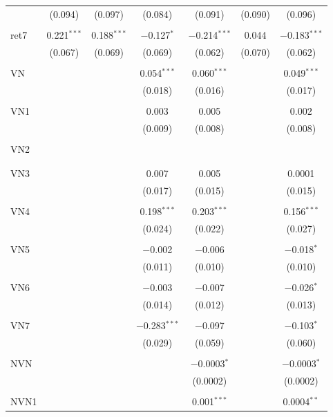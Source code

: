 \begin{table}[!htbp]
\begin{tabular}{@{\extracolsep{5pt}}lcccccc}
  & (0.094) & (0.097) & (0.084) & (0.091) & (0.090) & (0.096) \\ 
  & & & & & & \\ 
 ret7 & 0.221$^{***}$ & 0.188$^{***}$ & $-$0.127$^{*}$ & $-$0.214$^{***}$ & 0.044 & $-$0.183$^{***}$ \\ 
  & (0.067) & (0.069) & (0.069) & (0.062) & (0.070) & (0.062) \\ 
  & & & & & & \\ 
 VN &  &  & 0.054$^{***}$ & 0.060$^{***}$ &  & 0.049$^{***}$ \\ 
  &  &  & (0.018) & (0.016) &  & (0.017) \\ 
  & & & & & & \\ 
 VN1 &  &  & 0.003 & 0.005 &  & 0.002 \\ 
  &  &  & (0.009) & (0.008) &  & (0.008) \\ 
  & & & & & & \\ 
 VN2 &  &  &  &  &  &  \\ 
  &  &  &  &  &  &  \\ 
  & & & & & & \\ 
 VN3 &  &  & 0.007 & 0.005 &  & 0.0001 \\ 
  &  &  & (0.017) & (0.015) &  & (0.015) \\ 
  & & & & & & \\ 
 VN4 &  &  & 0.198$^{***}$ & 0.203$^{***}$ &  & 0.156$^{***}$ \\ 
  &  &  & (0.024) & (0.022) &  & (0.027) \\ 
  & & & & & & \\ 
 VN5 &  &  & $-$0.002 & $-$0.006 &  & $-$0.018$^{*}$ \\ 
  &  &  & (0.011) & (0.010) &  & (0.010) \\ 
  & & & & & & \\ 
 VN6 &  &  & $-$0.003 & $-$0.007 &  & $-$0.026$^{*}$ \\ 
  &  &  & (0.014) & (0.012) &  & (0.013) \\ 
  & & & & & & \\ 
 VN7 &  &  & $-$0.283$^{***}$ & $-$0.097 &  & $-$0.103$^{*}$ \\ 
  &  &  & (0.029) & (0.059) &  & (0.060) \\ 
  & & & & & & \\ 
 NVN &  &  &  & $-$0.0003$^{*}$ &  & $-$0.0003$^{*}$ \\ 
  &  &  &  & (0.0002) &  & (0.0002) \\ 
  & & & & & & \\ 
 NVN1 &  &  &  & 0.001$^{***}$ &  & 0.0004$^{**}$ \\ 

\end{tabular}
\end{table}
